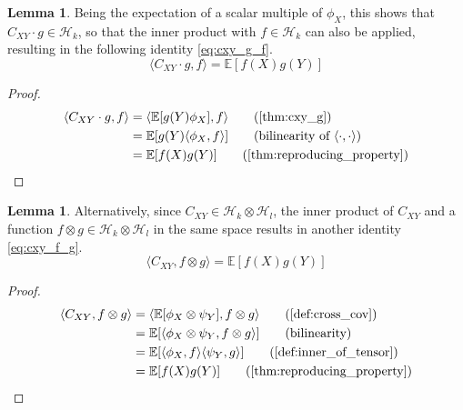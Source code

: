\documentclass[twoside]{article} \usepackage{aistats2017}
\theoremstyle{definition}
\newtheorem{lemma}[theorem]{Lemma}
\newcommand{\rv}[1]{{#1}}
\newcommand{\expect}[1]{{\mathbb{E}[#1]}}
\newcommand{\inner}[2]{{\langle #1, #2 \rangle}}
\newcommand{\phiX}{\phi_{\rv{X}}}
\newcommand{\psiY}{\psi_{\rv{Y}}}
\newcommand{\Cxy}{C_{\rv{X} \rv{Y}}}
\begin{document}
		\begin{lemma} \label{thm:cxy_g_f}
			Being the expectation of a scalar multiple of $\phiX$, this shows that $\Cxy \cdot g \in \mathcal{H}_{k}$, so that the inner product with $f \in \mathcal{H}_{k}$ can also be applied, resulting in the following identity \eqref{eq:cxy_g_f}.
			\begin{equation}
				\inner{\Cxy \cdot g}{f} = \expect{f(\rv{X}) g(\rv{Y})}
			\label{eq:cxy_g_f}
			\end{equation}
			\begin{proof}
			\begin{align*}
				\inner{\Cxy \cdot g}{f} &= \inner{\expect{g(\rv{Y}) \phiX}}{f} \tag{\cref{thm:cxy_g}}\\
				&= \expect{g(\rv{Y}) \inner{\phiX}{f}} \tag{bilinearity of $\inner{\cdot}{\cdot}$} \\
				&= \expect{f(\rv{X}) g(\rv{Y})} \tag{\cref{thm:reproducing_property}}
			\end{align*}
			\end{proof}
		\end{lemma}
			
	
		\begin{lemma} \label{thm:cxy_f_g}
			Alternatively, since $\Cxy \in \mathcal{H}_{k} \otimes \mathcal{H}_{l}$, the inner product of $\Cxy$ and a function $f \otimes g \in \mathcal{H}_{k} \otimes \mathcal{H}_{l}$ in the same space results in another identity \eqref{eq:cxy_f_g}.
			\begin{equation}
				\inner{\Cxy}{f \otimes g} = \expect{f(X) g(Y)}
			\label{eq:cxy_f_g}
			\end{equation}
			
			\begin{proof}
			\begin{align*}
				\inner{\Cxy}{f \otimes g} &= \inner{\expect{\phiX \otimes \psiY}}{f \otimes g} \tag{\cref{def:cross_cov}} \\
				&= \expect{\inner{\phiX \otimes \psiY}{f \otimes g}} \tag{bilinearity} \\
				&= \expect{\inner{\phiX}{f} \inner{\psiY}{g}} \tag{\cref{def:inner_of_tensor}}\\
				&= \expect{f(\rv{X}) g(\rv{Y})} \tag{\cref{thm:reproducing_property}}
			\end{align*}
			\end{proof}			
		\end{lemma}
		
\end{document}
